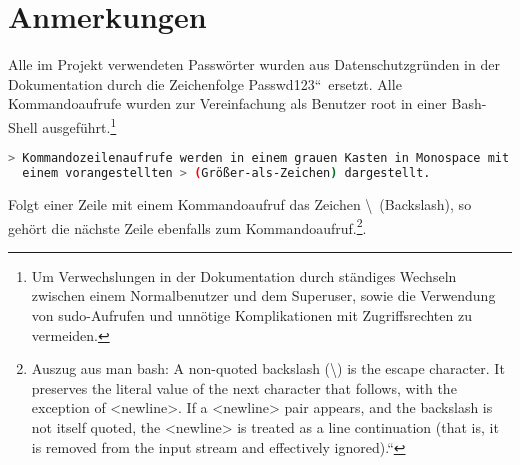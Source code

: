 \documentclass[10pt,a4paper,oneside,ngerman]{article}
\author{Kilian Engelhardt}
\title{}
\date{\today}
\newcommand{\qr}{\textquotedblleft}		%
\newcommand{\ql}{\quotedblbase}			%
\begin{document}
\pagestyle{empty}

\tableofcontents
\newpage
\pagestyle{fancy}
\setcounter{page}{1}

\section{Anmerkungen}

Alle im Projekt verwendeten Passwörter wurden aus Datenschutzgründen in der Dokumentation durch die Zeichenfolge \ql Passwd123\qr\ ersetzt. Alle Kommandoaufrufe wurden zur Vereinfachung als Benutzer root in einer Bash-Shell ausgeführt.\footnote{Um Verwechslungen in der Dokumentation durch ständiges Wechseln zwischen einem Normalbenutzer und dem Superuser, sowie die Verwendung von sudo-Aufrufen und unnötige Komplikationen mit Zugriffsrechten zu vermeiden.}

\begin{lstlisting}[frame=single,backgroundcolor = \color{lightgray},language=bash]
> Kommandozeilenaufrufe werden in einem grauen Kasten in Monospace mit
  einem vorangestellten > (Größer-als-Zeichen) dargestellt.
\end{lstlisting}

\noindent Folgt einer Zeile mit einem Kommandoaufruf das Zeichen \textbackslash\ (Backslash), so gehört die nächste Zeile ebenfalls zum Kommandoaufruf.\footnote{Auszug aus man bash: \ql A non-quoted backslash (\textbackslash) is the escape character. It preserves the literal value of the next character that follows, with the exception of <newline>. If a <newline> pair appears, and the backslash is not itself quoted, the <newline> is treated as a line continuation (that is, it is removed from the input stream and effectively ignored).\qr}.


\end{document}
